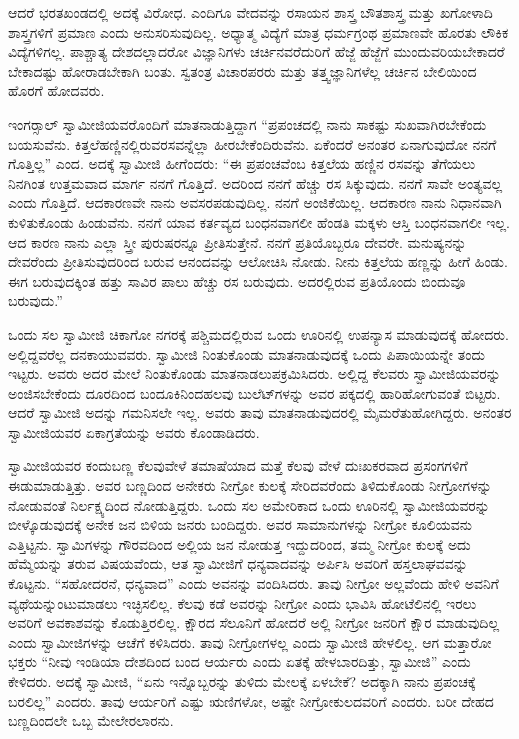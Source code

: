  ಆದರೆ ಭರತಖಂಡದಲ್ಲಿ ಅದಕ್ಕೆ ವಿರೋಧ. ಎಂದಿಗೂ ವೇದವನ್ನು ರಸಾಯನ ಶಾಸ್ತ್ರ ಬೌತಶಾಸ್ತ್ರ ಮತ್ತು ಖಗೋಳಾದಿ ಶಾಸ್ತ್ರಗಳಿಗೆ ಪ್ರಮಾಣ ಎಂದು ಅನುಸರಿಸುವುದಿಲ್ಲ. ಅಧ್ಯಾತ್ಮ ವಿದ್ಯೆಗೆ ಮಾತ್ರ ಧರ್ಮಗ್ರಂಥ ಪ್ರಮಾಣವೇ ಹೊರತು ಲೌಕಿಕ ವಿದ್ಯೆಗಳಿಗಲ್ಲ. ಪಾಶ್ಚಾತ್ಯ ದೇಶದಲ್ಲಾದರೋ ವಿಜ್ಞಾನಿಗಳು ಚರ್ಚಿನವರೆದುರಿಗೆ ಹೆಜ್ಜೆ ಹೆಜ್ಜೆಗೆ ಮುಂದುವರಿಯಬೇಕಾದರೆ ಬೇಕಾದಷ್ಟು ಹೋರಾಡಬೇಕಾಗಿ ಬಂತು. ಸ್ವತಂತ್ರ ವಿಚಾರಪರರು ಮತ್ತು ತತ್ತ್ವಜ್ಞಾನಿಗಳೆಲ್ಲ ಚರ್ಚಿನ ಬೇಲಿಯಿಂದ ಹೊರಗೆ ಹೋದವರು. 

 ಇಂಗರ್‍ಸಾಲ್ ಸ್ವಾಮೀಜಿಯವರೊಂದಿಗೆ ಮಾತನಾಡುತ್ತಿದ್ದಾಗ “ಪ್ರಪಂಚದಲ್ಲಿ ನಾನು ಸಾಕಷ್ಟು ಸುಖವಾಗಿರಬೇಕೆಂದು ಬಯಸುವೆನು. ಕಿತ್ತಲೆಹಣ್ಣಿನಲ್ಲಿರುವ\break ರಸವನ್ನೆಲ್ಲಾ ಹೀರಬೇಕೆಂದಿರುವೆನು. ಏಕೆಂದರೆ ಅನಂತರ ಏನಾಗುವುದೋ ನನಗೆ ಗೊತ್ತಿಲ್ಲ” ಎಂದ. ಅದಕ್ಕೆ ಸ್ವಾಮೀಜಿ ಹೀಗೆಂದರು: “ಈ ಪ್ರಪಂಚವೆಂಬ ಕಿತ್ತಲೆಯ ಹಣ್ಣಿನ ರಸವನ್ನು ತೆಗೆಯಲು ನಿನಗಿಂತ ಉತ್ತಮವಾದ ಮಾರ್ಗ ನನಗೆ ಗೊತ್ತಿದೆ. ಅದರಿಂದ ನನಗೆ ಹೆಚ್ಚು ರಸ ಸಿಕ್ಕುವುದು. ನನಗೆ ಸಾವೇ ಅಂತ್ಯವಲ್ಲ ಎಂದು ಗೊತ್ತಿದೆ. ಆದಕಾರಣವೇ ನಾನು ಅವಸರಪಡುವುದಿಲ್ಲ. ನನಗೆ ಅಂಜಿಕೆಯಿಲ್ಲ. ಆದಕಾರಣ ನಾನು ನಿಧಾನವಾಗಿ ಕುಳಿತುಕೊಂಡು ಹಿಂಡುವೆನು. ನನಗೆ ಯಾವ ಕರ್ತವ್ಯದ ಬಂಧನವಾಗಲೀ ಹೆಂಡತಿ ಮಕ್ಕಳು ಆಸ್ತಿ ಬಂಧನವಾಗಲೀ ಇಲ್ಲ. ಆದ ಕಾರಣ ನಾನು ಎಲ್ಲಾ ಸ್ತ್ರೀ ಪುರುಷರನ್ನೂ ಪ್ರೀತಿಸುತ್ತೇನೆ. ನನಗೆ ಪ್ರತಿಯೊಬ್ಬರೂ ದೇವರೇ. ಮನುಷ್ಯನನ್ನು ದೇವರೆಂದು ಪ್ರೀತಿಸುವುದರಿಂದ ಬರುವ ಆನಂದವನ್ನು ಆಲೋಚಿಸಿ ನೋಡು. ನೀನು ಕಿತ್ತಲೆಯ ಹಣ್ಣನ್ನು ಹೀಗೆ ಹಿಂಡು. ಈಗ ಬರುವುದಕ್ಕಿಂತ ಹತ್ತು ಸಾವಿರ ಪಾಲು ಹೆಚ್ಚು ರಸ ಬರುವುದು. ಅದರಲ್ಲಿರುವ ಪ್ರತಿಯೊಂದು ಬಿಂದುವೂ ಬರುವುದು.” 

\vskip 2pt

 ಒಂದು ಸಲ ಸ್ವಾಮೀಜಿ ಚಿಕಾಗೋ ನಗರಕ್ಕೆ ಪಶ್ಚಿಮದಲ್ಲಿರುವ ಒಂದು ಊರಿನಲ್ಲಿ ಉಪನ್ಯಾಸ ಮಾಡುವುದಕ್ಕೆ ಹೋದರು. ಅಲ್ಲಿದ್ದವರೆಲ್ಲ ದನಕಾಯುವವರು. ಸ್ವಾಮೀಜಿ ನಿಂತುಕೊಂಡು ಮಾತನಾಡುವುದಕ್ಕೆ ಒಂದು ಪಿಪಾಯಿಯನ್ನೇ ತಂದು ಇಟ್ಟರು. ಅವರು ಅದರ ಮೇಲೆ ನಿಂತುಕೊಂಡು ಮಾತನಾಡಲುಪಕ್ರಮಿಸಿದರು. ಅಲ್ಲಿದ್ದ ಕೆಲವರು ಸ್ವಾಮೀಜಿಯವರನ್ನು ಅಂಜಿಸಬೇಕೆಂದು ದೂರದಿಂದ ಬಂದೂಕಿನಿಂದ\break ಹಲವು ಬುಲೆಟ್‍ಗಳನ್ನು ಅವರ ಪಕ್ಕದಲ್ಲಿ ಹಾರಿಹೋಗುವಂತೆ ಬಿಟ್ಟರು. ಆದರೆ ಸ್ವಾಮೀಜಿ ಅದನ್ನು ಗಮನಿಸಲೇ ಇಲ್ಲ. ಅವರು ತಾವು ಮಾತನಾಡುವುದರಲ್ಲಿ ಮೈಮರೆತುಹೋಗಿದ್ದರು. ಅನಂತರ ಸ್ವಾಮೀಜಿಯವರ ಏಕಾಗ್ರತೆಯನ್ನು ಅವರು ಕೊಂಡಾಡಿದರು. 

\vskip 2pt

 ಸ್ವಾಮೀಜಿಯವರ ಕಂದುಬಣ್ಣ ಕೆಲವುವೇಳೆ ತಮಾಷೆಯಾದ ಮತ್ತೆ ಕೆಲವು ವೇಳೆ ದುಃಖಕರವಾದ ಪ್ರಸಂಗಗಳಿಗೆ ಈಡುಮಾಡುತ್ತಿತ್ತು. ಅವರ ಬಣ್ಣದಿಂದ ಅನೇಕರು ನೀಗ್ರೋ ಕುಲಕ್ಕೆ ಸೇರಿದವರೆಂದು ತಿಳಿದುಕೊಂಡು ನೀಗ್ರೋಗಳನ್ನು ನೋಡುವಂತೆ ನಿರ್ಲಕ್ಷ್ಯದಿಂದ ನೋಡುತ್ತಿದ್ದರು. ಒಂದು ಸಲ ಅಮೇರಿಕಾದ ಒಂದು ಊರಿನಲ್ಲಿ ಸ್ವಾಮೀಜಿಯವರನ್ನು ಬೀಳ್ಕೊಡುವುದಕ್ಕೆ ಅನೇಕ ಜನ ಬಿಳಿಯ ಜನರು ಬಂದಿದ್ದರು. ಅವರ ಸಾಮಾನುಗಳನ್ನು ನೀಗ್ರೋ ಕೂಲಿಯವನು ಎತ್ತಿಟ್ಟನು. ಸ್ವಾಮಿಗಳನ್ನು ಗೌರವದಿಂದ ಅಲ್ಲಿಯ ಜನ ನೋಡುತ್ತ ಇದ್ದುದರಿಂದ, ತಮ್ಮ ನೀಗ್ರೋ ಕುಲಕ್ಕೆ ಅದು ಹೆಮ್ಮೆಯನ್ನು ತರುವ ವಿಷಯವೆಂದು, ಆತ ಸ್ವಾಮೀಜಿಗೆ ಧನ್ಯವಾದವನ್ನು ಅರ್ಪಿಸಿ ಅವರಿಗೆ ಹಸ್ತಲಾಘವವನ್ನು ಕೊಟ್ಟನು. “ಸಹೋದರನೆ, ಧನ್ಯವಾದ” ಎಂದು ಅವನನ್ನು ವಂದಿಸಿದರು. ತಾವು ನೀಗ್ರೋ ಅಲ್ಲವೆಂದು ಹೇಳಿ ಅವನಿಗೆ ವ್ಯಥೆಯನ್ನುಂಟುಮಾಡಲು ಇಚ್ಛಿಸಲಿಲ್ಲ. ಕೆಲವು ಕಡೆ ಅವರನ್ನು ನೀಗ್ರೋ ಎಂದು ಭಾವಿಸಿ ಹೋಟೆಲಿನಲ್ಲಿ ಇರಲು ಅವರಿಗೆ ಅವಕಾಶವನ್ನು ಕೊಡುತ್ತಿರಲಿಲ್ಲ. ಕ್ಷೌರದ ಸೆಲೂನಿಗೆ ಹೋದರೆ ಅಲ್ಲಿ ನೀಗ್ರೋ‌ ಜನರಿಗೆ ಕ್ಷೌರ ಮಾಡುವುದಿಲ್ಲ ಎಂದು ಸ್ವಾಮೀಜಿಗಳನ್ನು ಆಚೆಗೆ ಕಳಿಸಿದರು. ತಾವು ನೀಗ್ರೋಗಳಲ್ಲ ಎಂದು ಸ್ವಾಮೀಜಿ ಹೇಳಲಿಲ್ಲ. ಆಗ ಮತ್ತಾರೋ ಭಕ್ತರು “ನೀವು ಇಂಡಿಯಾ ದೇಶದಿಂದ ಬಂದ ಆರ್ಯರು ಎಂದು ಏತಕ್ಕೆ ಹೇಳಬಾರದಿತ್ತು, ಸ್ವಾಮೀಜಿ” ಎಂದು ಕೇಳಿದರು. ಅದಕ್ಕೆ ಸ್ವಾಮೀಜಿ,‌‌ “ಏನು ಇನ್ನೊಬ್ಬರನ್ನು ತುಳಿದು ಮೇಲಕ್ಕೆ ಏಳಬೇಕೆ? ಅದಕ್ಕಾಗಿ ನಾನು ಪ್ರಪಂಚಕ್ಕೆ ಬರಲಿಲ್ಲ‌” ಎಂದರು. ತಾವು ಆರ್ಯರಿಗೆ ಎಷ್ಟು ಋಣಿಗಳೋ, ಅಷ್ಟೇ ನೀಗ್ರೋಕುಲದವರಿಗೆ ಎಂದರು. ಬರೀ ದೇಹದ ಬಣ್ಣದಿಂದಲೇ ಒಬ್ಬ ಮೇಲೇರಲಾರನು. 

